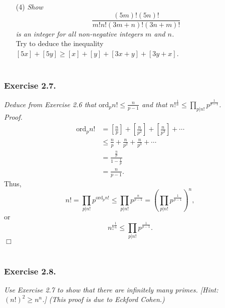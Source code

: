 \documentclass{article}
\begin{document}
\begin{enumerate}
\item[(4)]
\emph{Show
$$\frac{(5m)!(5n)!}{m! n! (3m + n)! (3n + m)!}$$
is an integer for all non-negative integers $m$ and $n$.} \\

Try to deduce the inequality $[5x] + [5y] \geq [x] + [y] + [3x + y] + [3y + x]$. \\\\
\end{enumerate}






\subsubsection*{Exercise 2.7.}
\emph{Deduce from Exercise 2.6 that $\text{ord}_p n! \leq \frac{n}{p - 1}$ and that
$n!^{\frac{1}{n}} \leq \prod_{p|n!}p^{\frac{1}{p - 1}}$.} \\

\emph{Proof.}
\begin{align*}
\text{ord}_p n!
&= \left[\frac{n}{p}\right] + \left[\frac{n}{p^2}\right] + \left[\frac{n}{p^3}\right] + \cdots \\
&\leq \frac{n}{p} + \frac{n}{p^2} + \frac{n}{p^3} + \cdots \\
&= \frac{\frac{n}{p}}{1 - \frac{1}{p}} \\
&= \frac{n}{p - 1}.
\end{align*}
Thus,
$$n!
= \prod_{p|n!} p^{\text{ord}_p n!}
\leq \prod_{p|n!} p^{\frac{n}{p - 1}}
= \left( \prod_{p|n!} p^{\frac{1}{p - 1}} \right)^n, $$
or
$$n!^{\frac{1}{n}} \leq \prod_{p|n!}p^{\frac{1}{p - 1}}.$$
$\Box$ \\\\






\subsubsection*{Exercise 2.8.}
\emph{Use Exercise 2.7 to show that there are infinitely many primes.
[Hint: $(n!)^2 \geq n^n$.]
(This proof is due to Eckford Cohen.)} \\
\end{document}
